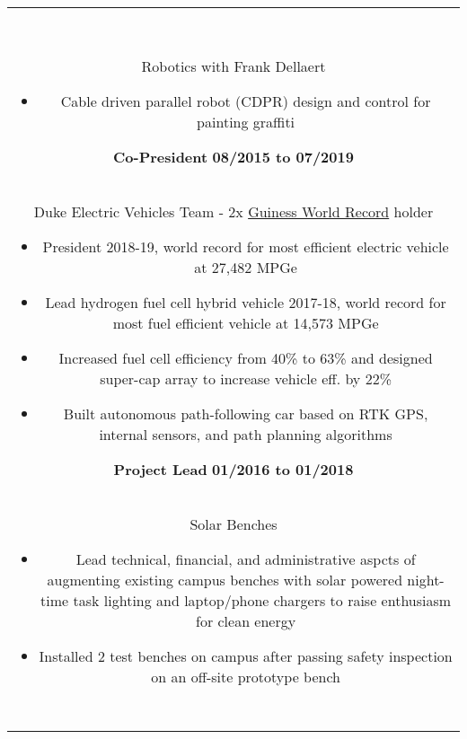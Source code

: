 \documentclass[11pt]{amsart}
\newcommand*\ruleline[1]{\par\noindent\raisebox{.8ex}{\makebox[\linewidth]{\hrulefill\hspace{1ex}\raisebox{-.8ex}{\Large~#1~}\hspace{1ex}\hrulefill}}\\ \-\ \vspace{-1em}}
\begin{document}
\begin{center}
\begin{tabular}{c}
	\ruleline{Activities}
	\begin{minipage}{\textwidth}
		{\bf PhD Researcher} \hfill {\bf 08/2019 to Present}\\
		{Robotics with Frank Dellaert}
		\begin{itemize}
			\item Cable driven parallel robot (CDPR) design and control for painting graffiti
		\end{itemize}
		{\bf Co-President} \hfill {\bf 08/2015 to 07/2019}\\
		{Duke Electric Vehicles Team - 2x \href{http://www.guinnessworldrecords.com/world-records/most-fuel-efficient-vehicle}{Guiness World Record} holder}
		\begin{itemize}
			\item President 2018-19, world record for most efficient electric vehicle at 27,482 MPGe
			\item Lead hydrogen fuel cell hybrid vehicle 2017-18, world record for most fuel efficient vehicle at 14,573 MPGe
			\item Increased fuel cell efficiency from 40\% to 63\% and designed super-cap array to increase vehicle eff. by 22\%
			\item Built autonomous path-following car based on RTK GPS, internal sensors, and path planning algorithms
		\end{itemize}
		{\bf Project Lead} \hfill {\bf 01/2016 to 01/2018}\\
		{Solar Benches}
		\begin{itemize}
			\item Lead technical, financial, and administrative aspcts of augmenting existing campus benches with solar powered night-time task lighting and laptop/phone chargers to raise enthusiasm for clean energy
			\item Installed 2 test benches on campus after passing safety inspection on an off-site prototype bench		\end{itemize}
	\end{minipage}\\~\\
	

\end{tabular}
\end{center}
\end{document}
